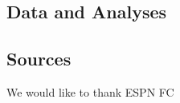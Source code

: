 \documentclass[USenglish]{article}
\begin{document}
\subsection{Data and Analyses} 


 

\subsection{Sources} 


 

\begin{acknowledgement}
We would like to thank ESPN FC
\end{acknowledgement}

%

\end{document}
